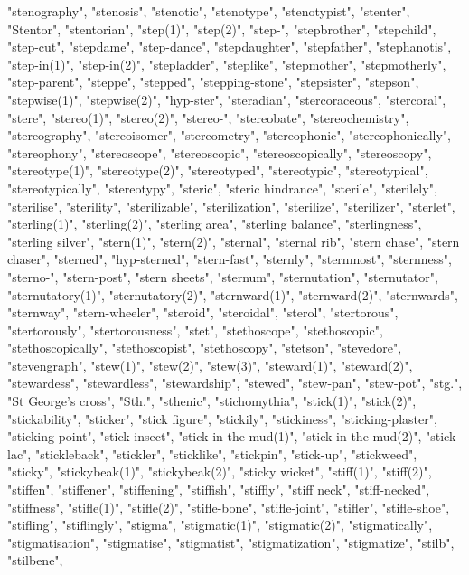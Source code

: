 "stenography",
"stenosis",
"stenotic",
"stenotype",
"stenotypist",
"stenter",
"Stentor",
"stentorian",
"step(1)",
"step(2)",
"step-",
"stepbrother",
"stepchild",
"step-cut",
"stepdame",
"step-dance",
"stepdaughter",
"stepfather",
"stephanotis",
"step-in(1)",
"step-in(2)",
"stepladder",
"steplike",
"stepmother",
"stepmotherly",
"step-parent",
"steppe",
"stepped",
"stepping-stone",
"stepsister",
"stepson",
"stepwise(1)",
"stepwise(2)",
"hyp-ster",
"steradian",
"stercoraceous",
"stercoral",
"stere",
"stereo(1)",
"stereo(2)",
"stereo-",
"stereobate",
"stereochemistry",
"stereography",
"stereoisomer",
"stereometry",
"stereophonic",
"stereophonically",
"stereophony",
"stereoscope",
"stereoscopic",
"stereoscopically",
"stereoscopy",
"stereotype(1)",
"stereotype(2)",
"stereotyped",
"stereotypic",
"stereotypical",
"stereotypically",
"stereotypy",
"steric",
"steric hindrance",
"sterile",
"sterilely",
"sterilise",
"sterility",
"sterilizable",
"sterilization",
"sterilize",
"sterilizer",
"sterlet",
"sterling(1)",
"sterling(2)",
"sterling area",
"sterling balance",
"sterlingness",
"sterling silver",
"stern(1)",
"stern(2)",
"sternal",
"sternal rib",
"stern chase",
"stern chaser",
"sterned",
"hyp-sterned",
"stern-fast",
"sternly",
"sternmost",
"sternness",
"sterno-",
"stern-post",
"stern sheets",
"sternum",
"sternutation",
"sternutator",
"sternutatory(1)",
"sternutatory(2)",
"sternward(1)",
"sternward(2)",
"sternwards",
"sternway",
"stern-wheeler",
"steroid",
"steroidal",
"sterol",
"stertorous",
"stertorously",
"stertorousness",
"stet",
"stethoscope",
"stethoscopic",
"stethoscopically",
"stethoscopist",
"stethoscopy",
"stetson",
"stevedore",
"stevengraph",
"stew(1)",
"stew(2)",
"stew(3)",
"steward(1)",
"steward(2)",
"stewardess",
"stewardless",
"stewardship",
"stewed",
"stew-pan",
"stew-pot",
"stg.",
"St George's cross",
"Sth.",
"sthenic",
"stichomythia",
"stick(1)",
"stick(2)",
"stickability",
"sticker",
"stick figure",
"stickily",
"stickiness",
"sticking-plaster",
"sticking-point",
"stick insect",
"stick-in-the-mud(1)",
"stick-in-the-mud(2)",
"stick lac",
"stickleback",
"stickler",
"sticklike",
"stickpin",
"stick-up",
"stickweed",
"sticky",
"stickybeak(1)",
"stickybeak(2)",
"sticky wicket",
"stiff(1)",
"stiff(2)",
"stiffen",
"stiffener",
"stiffening",
"stiffish",
"stiffly",
"stiff neck",
"stiff-necked",
"stiffness",
"stifle(1)",
"stifle(2)",
"stifle-bone",
"stifle-joint",
"stifler",
"stifle-shoe",
"stifling",
"stiflingly",
"stigma",
"stigmatic(1)",
"stigmatic(2)",
"stigmatically",
"stigmatisation",
"stigmatise",
"stigmatist",
"stigmatization",
"stigmatize",
"stilb",
"stilbene",

